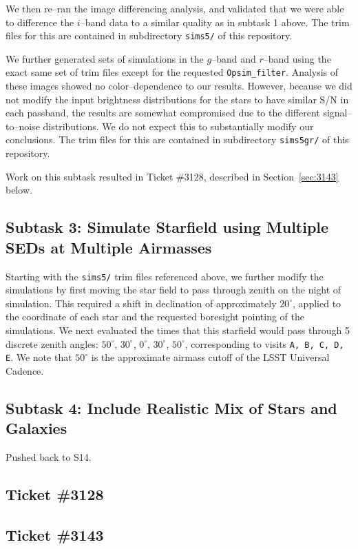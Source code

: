 \documentclass[prd, nofootinbib, floatfix, 11pt, tightenlines, times]{article}
\begin{document}
We then re--ran the image differencing analysis, and validated that we
were able to difference the $i$--band data to a similar quality as in
subtask 1 above.  The trim files for this are contained in
subdirectory {\tt sims5/} of this repository.

We further generated sets of simulations in the $g$--band and
$r$--band using the exact same set of trim files except for the
requested {\tt Opsim\_filter}.  Analysis of these images showed no
color--dependence to our results.  However, because we did not modify
the input brightness distributions for the stars to have similar S/N
in each passband, the results are somewhat compromised due to the
different signal--to--noise distributions.  We do not expect this to
substantially modify our conclusions.  The trim files for this are
contained in subdirectory {\tt sims5gr/} of this repository.

Work on this subtask resulted in Ticket \#3128, described in
Section~\ref{sec:3143} below.

\subsection{Subtask 3: Simulate Starfield using Multiple SEDs at Multiple Airmasses}

Starting with the {\tt sims5/} trim files referenced above, we further
modify the simulations by first moving the star field to pass through
zenith on the night of simulation.  This required a shift in
declination of approximately $20^{\circ}$, applied to the coordinate
of each star and the requested boresight pointing of the simulations.
We next evaluated the times that this starfield would pass through 5
discrete zenith angles: $50^{\circ}$, $30^{\circ}$, $0^{\circ}$,
$30^{\circ}$, $50^{\circ}$, corresponding to visits {\tt A, B, C, D,
  E}.  We note that $50^{\circ}$ is the approximate airmass cutoff of
the LSST Universal Cadence.

\subsection{Subtask 4: Include Realistic Mix of Stars and Galaxies}
Pushed back to S14.

\subsection{Ticket \#3128 \label{sec:3128}}

\subsection{Ticket \#3143 \label{sec:3143}}
\end{document}
